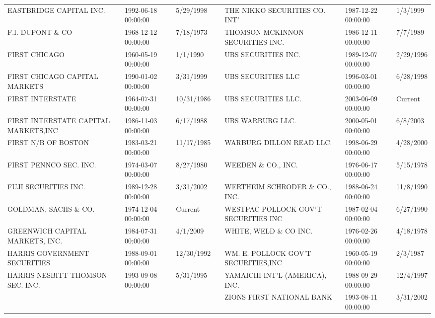 \documentclass{article}
\begin{document}
\begin{tabular}{lllllll}
EASTBRIDGE CAPITAL INC.              & 1992-06-18 00:00:00 & 5/29/1998 &  & THE NIKKO SECURITIES CO. INT'       & 1987-12-22 00:00:00 & 1/3/1999 \\
F.I. DUPONT \& CO                     & 1968-12-12 00:00:00 & 7/18/1973 &  & THOMSON MCKINNON SECURITIES INC.    & 1986-12-11 00:00:00 & 7/7/1989 \\
FIRST CHICAGO                       & 1960-05-19 00:00:00 & 1/1/1990 &  & UBS SECURITIES INC.                 & 1989-12-07 00:00:00 & 2/29/1996 \\
FIRST CHICAGO CAPITAL MARKETS       & 1990-01-02 00:00:00 & 3/31/1999 &  & UBS SECURITIES LLC                  & 1996-03-01 00:00:00 & 6/28/1998 \\
FIRST INTERSTATE                     & 1964-07-31 00:00:00 & 10/31/1986 &  & UBS SECURITIES LLC.                 & 2003-06-09 00:00:00 & Current \\
FIRST INTERSTATE CAPITAL MARKETS,INC & 1986-11-03 00:00:00 & 6/17/1988 &  & UBS WARBURG LLC.                    & 2000-05-01 00:00:00 & 6/8/2003 \\
FIRST N/B OF BOSTON                  & 1983-03-21 00:00:00 & 11/17/1985 &  & WARBURG DILLON READ LLC.            & 1998-06-29 00:00:00 & 4/28/2000 \\
FIRST PENNCO SEC. INC.               & 1974-03-07 00:00:00 & 8/27/1980 &  & WEEDEN \& CO., INC.                   & 1976-06-17 00:00:00 & 5/15/1978 \\
FUJI SECURITIES INC.                & 1989-12-28 00:00:00 & 3/31/2002 &  & WERTHEIM SCHRODER \& CO., INC.        & 1988-06-24 00:00:00 & 11/8/1990 \\
GOLDMAN, SACHS \& CO.                & 1974-12-04 00:00:00 & Current &  & WESTPAC POLLOCK GOV'T SECURITIES INC & 1987-02-04 00:00:00 & 6/27/1990 \\
GREENWICH CAPITAL MARKETS, INC.      & 1984-07-31 00:00:00 & 4/1/2009 &  & WHITE, WELD \& CO INC.                & 1976-02-26 00:00:00 & 4/18/1978 \\
HARRIS GOVERNMENT SECURITIES        & 1988-09-01 00:00:00 & 12/30/1992 &  & WM. E. POLLOCK GOV'T SECURITIES,INC  & 1960-05-19 00:00:00 & 2/3/1987 \\
HARRIS NESBITT THOMSON SEC. INC.    & 1993-09-08 00:00:00 & 5/31/1995 &  & YAMAICHI INT'L (AMERICA), INC.      & 1988-09-29 00:00:00 & 12/4/1997 \\
 &  &  &  & ZIONS FIRST NATIONAL BANK            & 1993-08-11 00:00:00 & 3/31/2002 \\
\bottomrule
\end{tabular}
\end{document}
